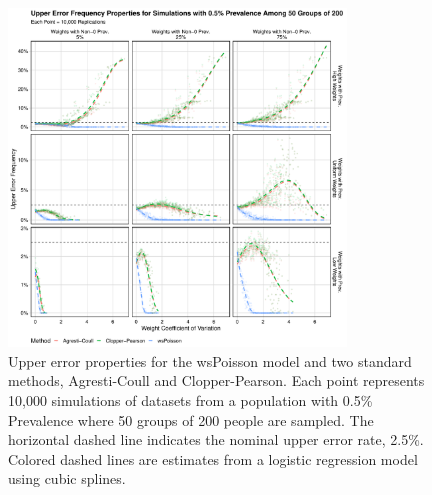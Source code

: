 \documentclass[AMA,STIX1COL]{WileyNJD-v2}
\begin{document}
\begin{figure}
\centering
\includegraphics[width=0.8\textwidth]{figures/perfect_upper_error_frequency_50_groups_0_005_prev.pdf}
\caption{Upper error properties for the wsPoisson model and two standard methods, Agresti-Coull and Clopper-Pearson.
Each point represents 10,000 simulations of datasets from a population with 0.5\% Prevalence where 50 groups of 200 people are sampled.
The horizontal dashed line indicates the nominal upper error rate, 2.5\%.
Colored dashed lines are estimates from a logistic regression model using cubic splines.}
\label{fig:perfect_upper_error_frequency_50_groups_0_005_prev}
\end{figure}
\end{document}
